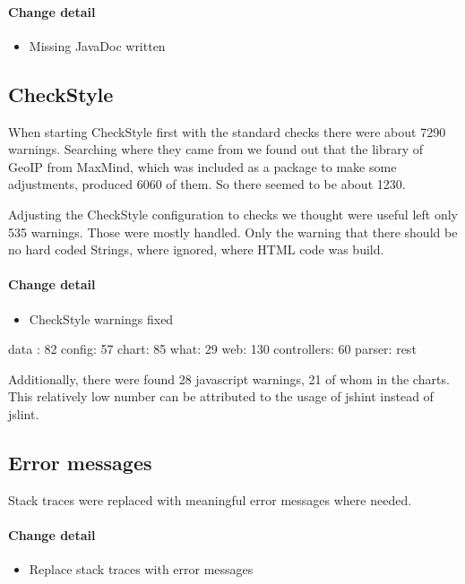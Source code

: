 \paragraph{Change detail}
\begin{itemize}
  \item Missing JavaDoc written
\end{itemize}

\subsection{CheckStyle}\label{cs} %
When starting CheckStyle first with the standard checks there were about 7290 warnings.
Searching where they came from we found out that the library of GeoIP from MaxMind, 
which was included as a package to make some adjustments, produced 6060 of them. So there seemed to be about
1230.

Adjusting the CheckStyle configuration to checks we thought were useful left only 535 warnings.
Those were mostly handled. Only the warning that there should be no hard coded Strings, where
ignored, where HTML code was build.

\paragraph{Change detail}
\begin{itemize}
  \item CheckStyle warnings fixed
\end{itemize}
data : 82
config: 57
chart: 85
what: 29
web: 130
controllers: 60 
parser: rest

Additionally, there were found 28 javascript warnings, 21 of whom in the charts.
This relatively low number can be attributed to the usage of jshint instead of jslint.

\subsection{Error messages}
Stack traces were replaced with meaningful error messages where needed.
\paragraph{Change detail}
\begin{itemize}
  \item Replace stack traces with error messages
\end{itemize}

 
